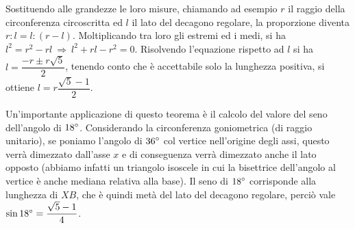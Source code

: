 Sostituendo alle grandezze le loro misure, chiamando ad esempio $r$ il raggio della circonferenza circoscritta ed $l$ il lato del decagono regolare, la proporzione diventa $r:l=l:(r-l)$.
Moltiplicando tra loro gli estremi ed i medi, si ha $l^2=r^2-rl \:\Rightarrow\: l^2+rl-r^2=0$.
Risolvendo l'equazione rispetto ad $l$ si ha $l=\dfrac{-r\pm r\sqrt{5}}{2}$, tenendo conto che è accettabile solo la lunghezza positiva, si ottiene $l=r\dfrac{\sqrt{5}-1}{2}$.

\begin{wrapfigure}{r}{0.35\textwidth}
	\centering
\end{wrapfigure}
Un'importante applicazione di questo teorema è il calcolo del valore del seno dell'angolo di $18{}^{\circ}$.
Considerando la circonferenza goniometrica (di raggio unitario), se poniamo l'angolo di $36{}^{\circ}$ col vertice nell'origine degli assi, questo verrà dimezzato dall'asse $x$ e di conseguenza verrà dimezzato anche il lato opposto (abbiamo infatti un triangolo isoscele in cui la bisettrice dell'angolo al vertice è anche mediana relativa alla base).
Il seno di $18{}^{\circ}$ corrisponde alla lunghezza di $XB$, che è quindi metà del lato del decagono regolare, perciò vale $\sin 18{}^{\circ} = \dfrac{\sqrt{5}-1}{4}$.

\newpage



\cleardoublepage

